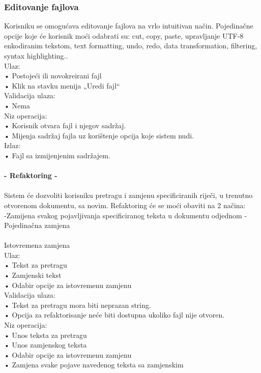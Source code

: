 \documentclass[utf8]{article}
\begin{document}
\subsubsection{Editovanje fajlova}
Korisniku se omogućava editovanje fajlova na vrlo intuitivan način. Pojedinačne opcije koje će korisnik moći odabrati su: cut, copy, paste, upravljanje UTF-8 enkodiranim tekstom, text formatting, undo, redo, data transformation, ﬁltering, syntax highlighting..\\
Ulaz:\\
•	Postojeći ili novokreirani fajl  \\
•	Klik na stavku menija „Uredi fajl“ \\
Validacija ulaza:\\
•	Nema\\
Niz operacija:\\
•	Korisnik otvara fajl i njegov sadržaj. \\
•	Mijenja sadržaj fajla uz korištenje opcija koje sistem nudi. \\
Izlaz:\\
•	Fajl sa izmijenjenim sadržajem.\\
\\
\textbf{- Refaktoring -}\\
\\
Sistem će dozvoliti korisniku pretragu i zamjenu speciﬁciranih riječi, u trenutno otvorenom dokumentu, sa novim. Refaktoring će se moći obaviti na 2 načina: \\
-Zamijena svakog pojavljivanja speciﬁciranog teksta u dokumentu odjednom - Pojedinačna zamjena\\
\\
Istovremena zamjena\\
Ulaz:\\
•	Tekst za pretragu \\
•	Zamjenski tekst\\
•	Odabir opcije za istovremenu zamjenu \\
Validacija ulaza:\\
•	Tekst za pretragu mora biti neprazan string. \\
•	Opcija za refaktorisanje neće biti dostupna ukoliko fajl nije otvoren. \\
Niz operacija:\\
•	Unos teksta za pretragu \\
•	Unos zamjenskog teksta \\
•	Odabir opcije za istovremenu zamjenu \\
•	Zamjena svake pojave navedenog teksta sa zamjenskim \\
\end{document}
